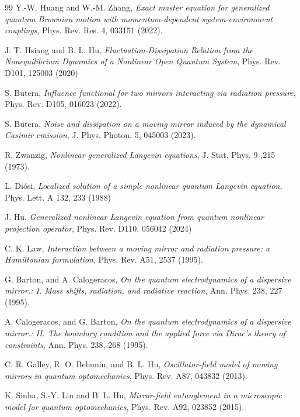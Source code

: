 \documentclass[%
amssymb,preprint,preprintnumbers,nofootinbib,superscriptaddress]{revtex4}
\begin{document}
\begin{thebibliography}{99}
Y.-W. Huang and W.-M. Zhang, \textit{Exact master equation for generalized quantum Brownian motion with momentum-dependent system-environment couplings}, Phys. Rev. Res. 4, 033151 (2022).





J. T. Hsiang and B. L. Hu, \textit{Fluctuation-Dissipation Relation from the Nonequilibrium Dynamics of a Nonlinear Open Quantum System},    
Phys. Rev. D101, 125003 (2020) 

    S. Butera, \textit{Influence functional for two mirrors interacting via radiation pressure}, Phys. Rev. D105, 016023 (2022).


    S. Butera, \textit{Noise and dissipation on a moving mirror induced by the dynamical Casimir emission}, J. Phys. Photon. 5, 045003 (2023). 


R. Zwanzig, \textit{Nonlinear generalized Langevin equations}, J. Stat. Phys. 9 ,215 (1973). 

L. Di\'osi, \textit{Localized solution of a simple nonlinear quantum Langevin equation}, Phys. Lett. A 132, 233 (1988) 

J. Hu, \textit{Generalized nonlinear Langevin equation from quantum nonlinear projection operator}, Phys. Rev. D110, 056042 (2024)



    C. K. Law, \textit{Interaction between a moving mirror and radiation pressure: a Hamiltonian formulation}, Phys. Rev. A51, 2537 (1995).
    

    
    G. Barton, and A. Calogeracos, \textit{On the quantum electrodynamics of a dispersive mirror.: I. Mass shifts, radiation, and radiative reaction}, Ann. Phys. 238, 227 (1995).
    
    A. Calogeracos, and G. Barton, \textit{On the quantum electrodynamics of a dispersive mirror.: II. The boundary condition and the applied force via Dirac's theory of constraints}, Ann. Phys. 238, 268 (1995).
    
    C. R. Galley, R. O. Behunin, and B. L. Hu, \textit{Oscillator-field model of moving mirrors in quantum optomechanics}, Phys. Rev. A87, 043832 (2013).

    K. Sinha, S.-Y. Lin and B. L. Hu, \textit{Mirror-field entanglement in a microscopic model for quantum optomechanics}, Phys. Rev. A92, 023852 (2015).


\end{thebibliography}
\end{document}
